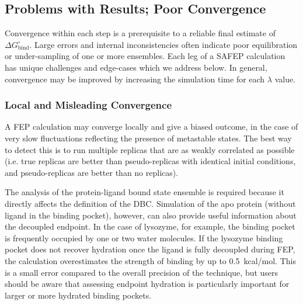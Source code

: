 \documentclass[9pt,tutorial]{Styling/livecoms}
\begin{document}
\subsection{Problems with Results; Poor Convergence}

Convergence within each step is a prerequisite to a reliable final estimate of $\Delta G^\circ_\mathrm{bind}$. Large errors and internal inconsistencies often indicate poor equilibration or under-sampling of one or more ensembles. Each leg of a SAFEP calculation has unique challenges and edge-cases which we address below.
In general, convergence may be improved by increasing the simulation time for each $\lambda$ value.

\subsubsection{Local and Misleading Convergence}
A FEP calculation may converge locally and give a biased outcome, in the case of very slow fluctuations reflecting the presence of metastable states.
The best way to detect this is to run multiple replicas that are as weakly correlated as possible (i.e. true replicas are better than pseudo-replicas with identical initial conditions, and pseudo-replicas are better than no replicas).

The analysis of the protein-ligand bound state ensemble is required because it directly affects the definition of the DBC.
Simulation of the apo protein (without ligand in the binding pocket), however, can also provide useful information about the decoupled endpoint.
In the case of lysozyme, for example, the binding pocket is frequently occupied by one or two water molecules.
If the lysozyme binding pocket does not recover hydration once the ligand is fully decoupled during FEP, the calculation overestimates the strength of binding by up to 0.5~kcal/mol. This is a small error compared to the overall precision of the technique, but users should be aware that assessing endpoint hydration is particularly important for larger or more hydrated binding pockets. 
\end{document}
